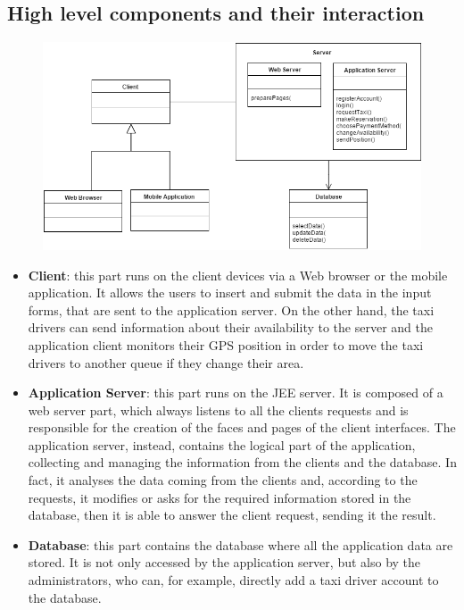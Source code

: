 		\subsection{High level components and their interaction}
			\vspace{1cm}
			\begin{figure}[h]
				\centering
				\includegraphics[scale=0.46]{Diagrams/HighLevelComp.png}
			\end{figure}
			\vspace{1cm}
			\begin{itemize}
				\item \textbf{Client}: this part runs on the client devices via a Web browser or the mobile application. It allows the users to insert and submit the data in the input forms, that are sent to the application server. On the other hand, the taxi drivers can send information about their availability to the server and the application client monitors their GPS position in order to move the taxi drivers to another queue if they change their area. 
				\item \textbf{Application Server}: this part runs on the JEE server. It is composed of a web server part, which always listens to all the clients requests and is responsible for the creation of the faces and pages of the client interfaces. The application server, instead, contains the logical part of the application, collecting and managing the information from the clients and the database. In fact, it analyses the data coming from the clients and, according to the requests, it modifies or asks for the required information stored in the database, then it is able to answer the client request, sending it the result.  
				\item \textbf{Database}: this part contains the database where all the application data are stored. It is not only accessed by the application server, but also by the administrators, who can, for example, directly add a taxi driver account to the database. 
			\end{itemize}	
			
